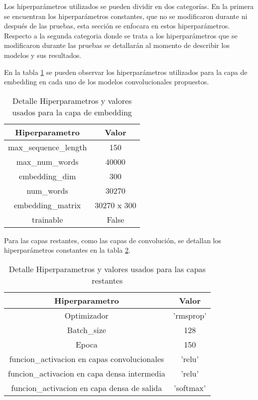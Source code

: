 Los hiperparámetros utilizados se pueden dividir en dos categorías. En la primera se encuentran los hiperparámetros constantes, que no se modificaron durante ni después de las pruebas, esta sección se enfocara en estos hiperparámetros. Respecto a la segunda categoria donde se trata a los hiperparámetros que se modificaron durante las pruebas se detallarán al momento de describir los modelos y sus resultados.

En la tabla \ref{tbl:3} se pueden observar los hiperparámetros utilizados para la capa de embedding en cada uno de los modelos convolucionales propuestos.

\begin{table}[!ht]
	\centering
	\begin{tabular}{|c|c|}
		\hline
		\textbf{Hiperparametro} & \textbf{Valor} \\ \hline
		max\_sequence\_length & 150 \\ \hline
		max\_num\_words  & 40000 \\ \hline
		embedding\_dim  & 300 \\ \hline
		num\_words & 30270 \\ \hline
		embedding\_matrix & 30270 x 300 \\ \hline
		trainable & False \\ \hline
	\end{tabular}
	\caption{Detalle Hiperparametros y valores usados para la capa de embedding}
	\label{tbl:3}
\end{table}

Para las capas restantes, como las capas de convolución, se detallan los hiperparámetros constantes en la tabla \ref{tbl:4}.

\begin{table}[!ht]
	\centering
	\begin{tabular}{|c|c|}
		\hline
		\textbf{Hiperparametro } & \textbf{Valor} \\ \hline
		Optimizador & 'rmsprop' \\ \hline
		Batch\_size & 128 \\ \hline
		Epoca & 150 \\ \hline
		funcion\_activacion en capas convolucionales & 'relu' \\ \hline
		funcion\_activacion en capa densa intermedia & 'relu' \\ \hline
		funcion\_activacion en capa densa de salida & 'softmax' \\ \hline
	\end{tabular}
	\caption{Detalle Hiperparametros y valores usados para las capas restantes}
	\label{tbl:4}
\end{table}



